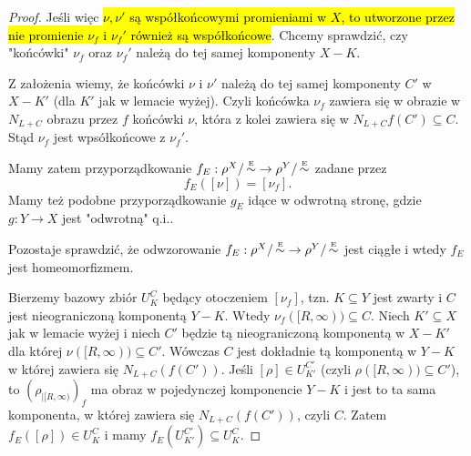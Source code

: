 \begin{proof}
  Jeśli więc \hl{$\nu,\nu'$ są współkońcowymi promieniami w $X$, to utworzone przez nie promienie $\nu_f$ i $\nu_f'$ również są współkońcowe}. Chcemy sprawdzić, czy "końcówki" $\nu_f$ oraz $\nu_f'$ należą do tej samej komponenty $X-K$.

  Z założenia wiemy, że końcówki $\nu$ i $\nu'$ należą do tej samej komponenty $C'$ w $X-K'$ (dla $K'$ jak w lemacie wyżej). Czyli końcówka $\nu_f$ zawiera się w obrazie w $N_{L+C}$ obrazu przez $f$ końcówki $\nu$, która z kolei zawiera się w $N_{L+C}f(C')\subseteq C$. Stąd $\nu_f$ jest wpsółkońcowe z $\nu_f'$. 

  Mamy zatem przyporządkowanie $f_E:\rho^X/\operatorname{\overset{{\scriptscriptstyle E}}{\sim}} \to \rho^Y/\operatorname{\overset{{\scriptscriptstyle E}}{\sim}}$ zadane przez 
  $$f_E([\nu])=[\nu_f].$$ 
  Mamy też podobne przyporządkowanie $g_E$ idące w odwrotną stronę, gdzie $g:Y\to X$ jest "odwrotną" q.i..

  Pozostaje sprawdzić, że odwzorowanie $f_E:\rho^X/\operatorname{\overset{{\scriptscriptstyle E}}{\sim}}\to \rho^Y/\operatorname{\overset{{\scriptscriptstyle E}}{\sim}}$ jest ciągłe i wtedy $f_E$ jest homeomorfizmem. 

  Bierzemy bazowy zbiór $U_K^C$ będący otoczeniem $[\nu_f]$, tzn. $K\subseteq Y$ jest zwarty i $C$ jest nieograniczoną komponentą $Y-K$. Wtedy $\nu_f([R,\infty))\subseteq C$. %
  Niech $K'\subseteq X$ jak w lemacie wyżej i niech $C'$ będzie tą nieograniczoną komponentą w $X-K'$ dla której $\nu([R,\infty))\subseteq C'$. Wówczas $C$ jest dokładnie tą komponentą w $Y-K$ w której zawiera się $N_{L+C}(f(C'))$.%
  Jeśli $[\rho]\in U_{K'}^{C'}$ (czyli $\rho([R, \infty))\subseteq C'$), to $(\rho_{|[R, \infty)})_f$ ma obraz w pojedynczej komponencie $Y-K$ i jest to ta sama komponenta, w której zawiera się $N_{L+C}(f(C'))$, czyli $C$. Zatem $f_E([\rho])\in U_K^C$ i mamy $f_E(U_{K'}^{C'})\subseteq U_K^C$.
\end{proof}


